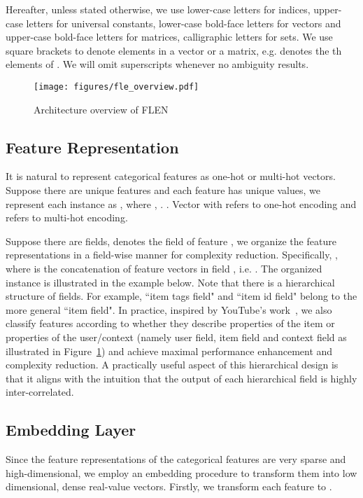 \documentclass[sigconf]{acmart}
\begin{document}
Hereafter, unless stated otherwise, we use lower-case letters for indices, upper-case letters for universal constants, lower-case bold-face letters for vectors and upper-case bold-face letters for matrices, calligraphic letters for sets. We use square brackets to denote elements in a vector or a matrix, e.g.  denotes the th elements of . We will omit superscripts whenever no ambiguity results.


\begin{figure}
\centering\texttt{[image: figures/fle\_overview.pdf]}
\caption{Architecture overview of FLEN}
\label{fig:overview}
\end{figure}

\subsection{Feature Representation}\label{sec:feature}

It is natural to represent categorical features as one-hot or multi-hot vectors. 
Suppose there are  unique features and each feature  has  unique values, we represent each instance as , where  , . . Vector  with  refers to one-hot encoding and  refers to multi-hot encoding.


Suppose there are  fields,  denotes the field of feature , we organize the feature representations in a field-wise manner for complexity reduction. 
Specifically, , where  is the concatenation of feature vectors in field , i.e. . 
The organized instance is illustrated in the example below. Note that there is a hierarchical structure of fields. For example, ``item tags field" and ``item id field" belong to the more general ``item field". 
In practice, inspired by YouTube's work~\citep{covington2016deep}, we also classify features according to whether they describe properties of the item or properties of the user/context (namely user field, item field and context field as illustrated in Figure~\ref{fig:overview}) and achieve maximal performance enhancement and complexity reduction. A practically useful aspect of this hierarchical design is that it aligns with the intuition that the output of each hierarchical field is highly inter-correlated.
 

\subsection{Embedding Layer}\label{sec:embedding}
Since the feature representations of the categorical features are very sparse and high-dimensional, we employ an embedding procedure to transform them into low dimensional, dense real-value vectors. 
Firstly, we transform each feature  to .   
\end{document}
